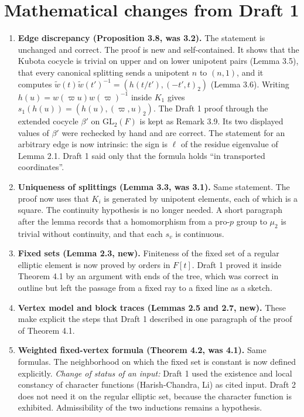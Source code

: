 \documentclass[12pt,letterpaper]{article}
\begin{document}
\section{Mathematical changes from Draft 1}
\begin{enumerate}
\item \textbf{Edge discrepancy (Proposition 3.8, was 3.2).} The statement is unchanged and correct. The proof is new and self-contained. It shows that the Kubota cocycle is trivial on upper and on lower unipotent pairs (Lemma 3.5), that every canonical splitting sends a unipotent $n$ to $(n,1)$, and it computes $\widetilde w(t)\widetilde w(t')^{-1}=(h(t/t'),(-t',t)_2)$ (Lemma 3.6). Writing $h(u)=w(\varpi u)w(\varpi)^{-1}$ inside $K_1$ gives $s_1(h(u))=(h(u),(\varpi,u)_2)$. The Draft 1 proof through the extended cocycle $\beta'$ on $\mathrm{GL}_2(F)$ is kept as Remark 3.9. Its two displayed values of $\beta'$ were rechecked by hand and are correct. The statement for an arbitrary edge is now intrinsic: the sign is $\ell$ of the residue eigenvalue of Lemma 2.1. Draft 1 said only that the formula holds ``in transported coordinates''.
\item \textbf{Uniqueness of splittings (Lemma 3.3, was 3.1).} Same statement. The proof now uses that $K_i$ is generated by unipotent elements, each of which is a square. The continuity hypothesis is no longer needed. A short paragraph after the lemma records that a homomorphism from a pro-$p$ group to $\mu_2$ is trivial without continuity, and that each $s_v$ is continuous.
\item \textbf{Fixed sets (Lemma 2.3, new).} Finiteness of the fixed set of a regular elliptic element is now proved by orders in $F[t]$. Draft 1 proved it inside Theorem 4.1 by an argument with ends of the tree, which was correct in outline but left the passage from a fixed ray to a fixed line as a sketch.
\item \textbf{Vertex model and block traces (Lemmas 2.5 and 2.7, new).} These make explicit the steps that Draft 1 described in one paragraph of the proof of Theorem 4.1.
\item \textbf{Weighted fixed-vertex formula (Theorem 4.2, was 4.1).} Same formulas. The neighborhood on which the fixed set is constant is now defined explicitly. \emph{Change of status of an input:} Draft 1 used the existence and local constancy of character functions (Harish-Chandra, Li) as cited input. Draft 2 does not need it on the regular elliptic set, because the character function is exhibited. Admissibility of the two inductions remains a hypothesis.

\end{enumerate}
\end{document}
